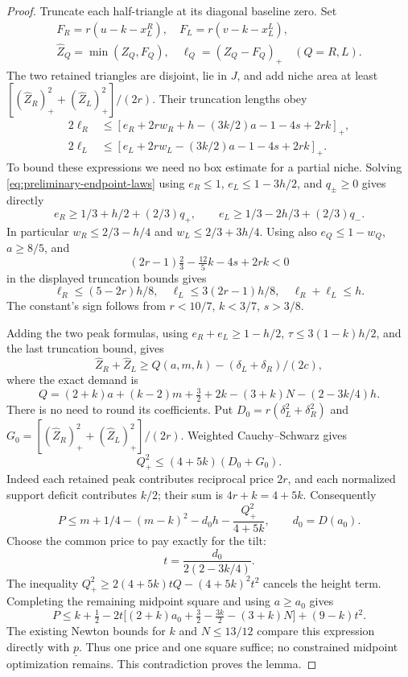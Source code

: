 \begin{proof}
Truncate each half-triangle at its diagonal baseline zero.
Set
\[
 \begin{gathered}
 F_R=r(u-k-x_L^R),\quad F_L=r(v-k-x_L^L),\\
 \widehat Z_Q=\min(Z_Q,F_Q),\quad
 \ell_Q=(Z_Q-F_Q)_+\quad(Q=R,L).
 \end{gathered}
\]
The two retained triangles are disjoint, lie in $J$, and add niche
area at least $[(\widehat Z_R)_+^2+(\widehat Z_L)_+^2]/(2r)$.
Their truncation lengths obey
\[
 \begin{split}
 2\ell_R&\le[e_R+2rw_R+h-(3k/2)a-1-4s+2rk]_+,\\
 2\ell_L&\le[e_L+2rw_L-(3k/2)a-1-4s+2rk]_+.
 \end{split}
\]
To bound these expressions we need no box estimate for a partial
niche. Solving \cref{eq:preliminary-endpoint-laws} using
$e_R\le1$, $e_L\le1-3h/2$, and $q_\pm\ge0$ gives directly
\[
 e_R\ge1/3+h/2+(2/3)q_+,\qquad
 e_L\ge1/3-2h/3+(2/3)q_-.
\]
In particular $w_R\le2/3-h/4$ and $w_L\le2/3+3h/4$.
Using also $e_Q\le1-w_Q$, $a\ge8/5$, and
\[
 (2r-1)\tfrac23-\tfrac{12}{5}k-4s+2rk<0
\]
in the displayed truncation bounds gives
\[
 \ell_R\le(5-2r)h/8,\quad
 \ell_L\le3(2r-1)h/8,\quad \ell_R+\ell_L\le h.
\]
The constant's sign follows from $r<10/7$, $k<3/7$, $s>3/8$.

Adding the two peak formulas, using $e_R+e_L\ge1-h/2$,
$\tau\le3(1-k)h/2$, and the last truncation bound, gives
\[
 \widehat Z_R+\widehat Z_L
 \ge Q(a,m,h)-(\delta_L+\delta_R)/(2c),
\]
where the exact demand is
\[
 Q=(2+k)a+(k-2)m+\tfrac32+2k-(3+k)N-(2-3k/4)h.
\]
There is no need to round its coefficients. Put
$D_0=r(\delta_L^2+\delta_R^2)$ and
$G_0=[(\widehat Z_R)_+^2+(\widehat Z_L)_+^2]/(2r)$.
Weighted Cauchy--Schwarz gives
\[
 Q_+^2\le(4+5k)(D_0+G_0).
\]
Indeed each retained peak contributes reciprocal price $2r$, and
each normalized support deficit contributes $k/2$; their sum is
$4r+k=4+5k$. Consequently
\[
 P\le m+1/4-(m-k)^2-d_0h-\frac{Q_+^2}{4+5k},
 \qquad d_0=D(a_0).
\]
Choose the common price to pay exactly for the tilt:
\[
 t=\frac{d_0}{2(2-3k/4)}.
\]
The inequality $Q_+^2\ge2(4+5k)tQ-(4+5k)^2t^2$
cancels the height term. Completing the remaining midpoint square
and using $a\ge a_0$ gives
\[
 P\le k+\tfrac12
 -2t\bigl[(2+k)a_0+\tfrac32-\tfrac{3k}{2}-(3+k)N\bigr]
 +(9-k)t^2.
\]
The existing Newton bounds for $k$ and $N\le13/12$ compare this
expression directly with $\underline p$. Thus one price and one
square suffice; no constrained midpoint optimization remains.
This contradiction proves the lemma.
\end{proof}

